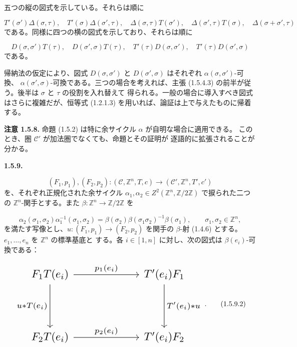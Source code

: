 \clearpage
{}%
五つの縦の図式を示している。それらは順に

\[
  T'(\sigma')\Delta(\sigma,\tau),\quad
  T'(\sigma)\Delta(\sigma',\tau),\quad
  \Delta(\sigma,\tau)T(\sigma'),\quad
  \Delta(\sigma',\tau)T(\sigma),\quad
  \Delta(\sigma+\sigma',\tau)
\]
である。同様に四つの横の図式を示しており、それらは順に

\[
  D(\sigma,\sigma')T(\tau),\quad
  D(\sigma',\sigma)T(\tau),\quad
  T'(\tau)D(\sigma,\sigma'),\quad
  T'(\tau)D(\sigma',\sigma)
\]
である。

帰納法の仮定により、図式 $D(\sigma,\sigma')$ と
$D(\sigma',\sigma)$ はそれぞれ $\alpha(\sigma,\sigma')$-可換、
$\alpha(\sigma',\sigma)$-可換である。三つの場合を考えれば、主張
(1.5.4.3) の前半が従う。後半は $\sigma$ と $\tau$ の役割を入れ替えて
得られる。一般の場合に導入すべき図式はさらに複雑だが、恒等式
(1.2.1.3) を用いれば、論証は上で与えたものに帰着する。

\noindent\textbf{注意 1.5.8.}\quad
命題 (1.5.2) は特に余サイクル $\alpha$ が自明な場合に適用できる。
このとき、圏 $\mathcal C'$ が加法圏でなくても、命題とその証明が
逐語的に拡張されることが分かる。

\noindent\textbf{1.5.9.}\quad

\[
  (F_1,p_1),(F_2,p_2)\colon
  (\mathcal C,\mathbb Z^n,T,c)
  \longrightarrow
  (\mathcal C',\mathbb Z^n,T',c')
\]
を、それぞれ正規化された余サイクル
$\alpha_1,\alpha_2\in Z^2(\mathbb Z^n,\mathbb Z/2\mathbb Z)$
で捩られた二つの $\mathbb Z^n$-関手とする。また
$\beta\colon\mathbb Z^n\to\mathbb Z/2\mathbb Z$ を

\begin{equation}
  \alpha_2(\sigma_1,\sigma_2)\alpha_1^{-1}(\sigma_1,\sigma_2)
  =\beta(\sigma_2)\beta(\sigma_1\sigma_2)^{-1}\beta(\sigma_1),
  \qquad \sigma_1,\sigma_2\in\mathbb Z^n,
  \tag{1.5.9.1}
\end{equation}
を満たす写像とし、$u\colon(F_1,p_1)\to(F_2,p_2)$ を関手の
$\beta$-射 (1.4.6) とする。$e_1,\ldots,e_n$ を $\mathbb Z^n$ の標準基底と
する。各 $i\in[1,n]$ に対し、次の図式は $\beta(e_i)$-可換である：

\begin{equation}
  \resizebox{0.78\textwidth}{!}{%
    $\begin{tikzcd}[ampersand replacement=\&,column sep=6em,row sep=4em]
      F_1T(e_i)
        \arrow[r,"{p_1(e_i)}"]
        \arrow[d,"{u*T(e_i)}"']
        \& T'(e_i)F_1
          \arrow[d,"{T'(e_i)*u}"] \\
      F_2T(e_i)
        \arrow[r,"{p_2(e_i)}"]
        \& T'(e_i)F_2
    \end{tikzcd}$%
  }\;.
  \tag{1.5.9.2}
\end{equation}
